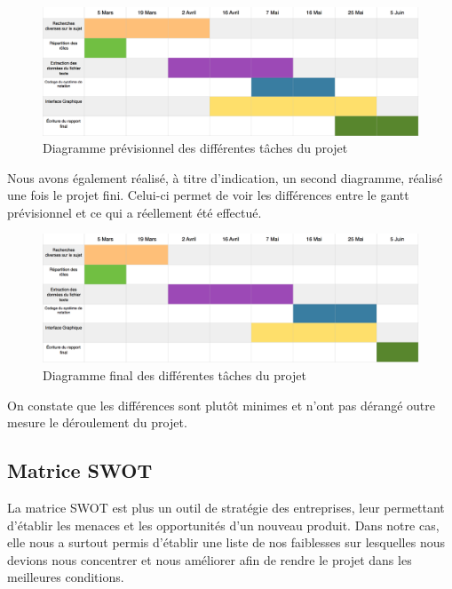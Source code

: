 \documentclass[light]{ceri}
\begin{document}
\begin{figure}[H]
\centering\includegraphics[width=17cm]{images/GANTT.png}
\caption{Diagramme prévisionnel des différentes tâches du projet}
\end{figure}  

Nous avons également réalisé, à titre d'indication, un second diagramme, réalisé une fois le projet fini. Celui-ci permet de voir les différences entre le gantt prévisionnel et ce qui a réellement été effectué.

\begin{figure}[H]
\centering\includegraphics[width=17cm]{images/GanttFinal.png}
\caption{Diagramme final des différentes tâches du projet}
\end{figure} 

On constate que les différences sont plutôt minimes et n'ont pas dérangé outre mesure le déroulement du projet.

\subsection{Matrice SWOT}

La matrice SWOT est plus un outil de stratégie des entreprises, leur permettant
d’établir les menaces et les opportunités d’un nouveau produit. Dans notre cas, elle
nous a surtout permis d’établir une liste de nos faiblesses sur lesquelles nous devions
nous concentrer et nous améliorer afin de rendre le projet dans les meilleures conditions.
\end{document}
